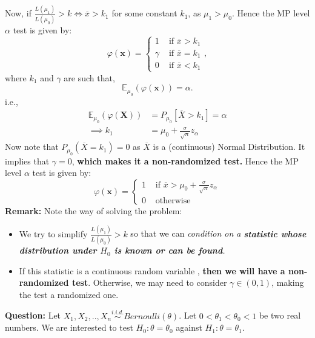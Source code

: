 \documentclass{article}
\begin{document}
Now, if $\frac{L\left( \mu_1 \right) }{L\left( \mu_0 \right) } > k \iff \overline{x} > k_1$ for some constant $k_1$, as $\mu_1 > \mu_0$.
\newline\newline
Hence the MP level $\alpha$ test is given by:
\[
	\varphi\left( \mathbf{x} \right) = \begin{cases}
		1 & \text{ if } \overline{x} > k_1\\
		\gamma & \text{ if } \overline{x} = k_1\\
		0 & \text{ if } \overline{x} < k_1
	\end{cases}
,\] 
where $k_1$ and $\gamma $ are such that,
\[
	\mathbb{E}_{\mu_0} \left( \varphi\left( \mathbf{x} \right)  \right) = \alpha
.\] 
i.e.,
\begin{equation*}
	\begin{split}
		\mathbb{E}_{\mu_0}\left( \varphi \left( \mathbf{X} \right)  \right) &=  P_{\mu_0}\left[ \overline{X} > k_1\right] = \alpha\\
		\implies k_1 &=  \mu_0 + \frac{\sigma}{\sqrt{n} } z_{\alpha} 
	\end{split}
\end{equation*}
Now note that $P_{\mu_0}\left( \overline{X} = k_1 \right)  = 0$ as $\overline{X}$ is a (continuous) Normal Distribution. It implies that $\gamma = 0$, \textbf{which makes it a non-randomized test. }
\newline\newline
Hence the MP level $\alpha$ test is given by:
\[
	\varphi\left( \mathbf{x} \right) = \begin{cases}
		1 & \text{ if } \overline{x} > \mu_0 + \frac{\sigma}{\sqrt{n} }z_{\alpha}\\
		0 & \text{ otherwise }
	\end{cases}
\] 
\textbf{Remark:} Note the way of solving the problem:
\begin{itemize}
	\item {We try to simplify $\frac{L\left( \mu_1 \right) }{L\left( \mu_0 \right) } > k$} so that we can \textit{condition on a \textbf{statistic whose distribution under $H_0$ is known or can be found}.} 
	\item {If this statistic is a continuous random variable , \textbf{then we will have a non-randomized test}. Otherwise, we may need to consider $\gamma \in  \left( 0,1 \right) $, making the test a randomized one.}
\end{itemize}
\textbf{Question:} Let $X_1, X_2, .. , X_{n} \overset{i.i.d.}{\sim} Bernoulli\left( \theta \right)$. Let $0 < \theta_1 < \theta_0 < 1 $ be two real numbers. We are interested to test $H_0 : \theta = \theta_0$ against $H_1 : \theta = \theta_1$. 
\end{document}
